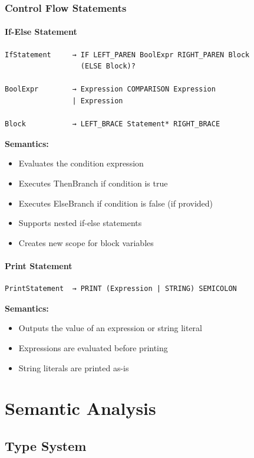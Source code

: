 \documentclass[12pt,a4paper]{report}
\begin{document}
\subsection{Control Flow Statements}

\subsubsection{If-Else Statement}
\begin{verbatim}
IfStatement     → IF LEFT_PAREN BoolExpr RIGHT_PAREN Block
                  (ELSE Block)?

BoolExpr        → Expression COMPARISON Expression
                | Expression

Block           → LEFT_BRACE Statement* RIGHT_BRACE
\end{verbatim}

\textbf{Semantics:}
\begin{itemize}
    \item Evaluates the condition expression
    \item Executes ThenBranch if condition is true
    \item Executes ElseBranch if condition is false (if provided)
    \item Supports nested if-else statements
    \item Creates new scope for block variables
\end{itemize}

\subsubsection{Print Statement}
\begin{verbatim}
PrintStatement  → PRINT (Expression | STRING) SEMICOLON
\end{verbatim}

\textbf{Semantics:}
\begin{itemize}
    \item Outputs the value of an expression or string literal
    \item Expressions are evaluated before printing
    \item String literals are printed as-is
\end{itemize}

\chapter{Semantic Analysis}

\section{Type System}
\end{document}
